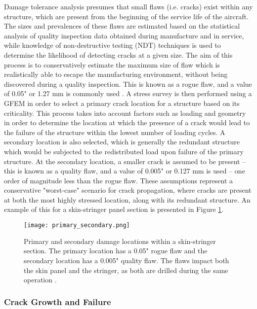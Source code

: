 Damage tolerance analysis presumes that small flaws (i.e. cracks) exist within any structure, which are present from the beginning of the service life of the aircraft. The sizes and prevalences of these flaws are estimated based on the statistical analysis of quality inspection data obtained during manufacture and in service, while knowledge of non-destructive testing (NDT) techniques is used to determine the likelihood of detecting cracks at a given size. The aim of this process is to conservatively estimate the maximum size of flaw which is realistically able to escape the manufacturing environment, without being discovered during a quality inspection. This is known as a rogue flaw, and a value of 0.05" or 1.27 mm is commonly used \cite{davidson_405_2003}. A stress survey is then performed using a GFEM in order to select a primary crack location for a structure based on its criticality. This process takes into account factors such as loading and geometry in order to determine the location at which the presence of a crack would lead to the failure of the structure within the lowest number of loading cycles. A secondary location is also selected, which is generally the redundant structure which would be subjected to the redistributed load upon failure of the primary structure. At the secondary location, a smaller crack is assumed to be present -- this is known as a quality flaw, and a value of 0.005" or 0.127 mm is used -- one order of magnitude less than the rogue flaw. These assumptions represent a conservative "worst-case" scenario for crack propagation, where cracks are present at both the most highly stressed location, along with its redundant structure. An example of this for a skin-stringer panel section is presented in Figure \ref{fig:primary_secondary}.

\begin{figure}[H]
	\centering
	\texttt{[image: primary\_secondary.png]}
	\caption{Primary and secondary damage locations within a skin-stringer section. The primary location has a 0.05" rogue flaw and the secondary location has a 0.005" quality flaw. The flaws impact both the skin panel and the stringer, as both are drilled during the same operation \cite{afgrow_dtdhandbook_nodate}.}
	\label{fig:primary_secondary}
\end{figure}

\subsubsection*{Crack Growth and Failure}

